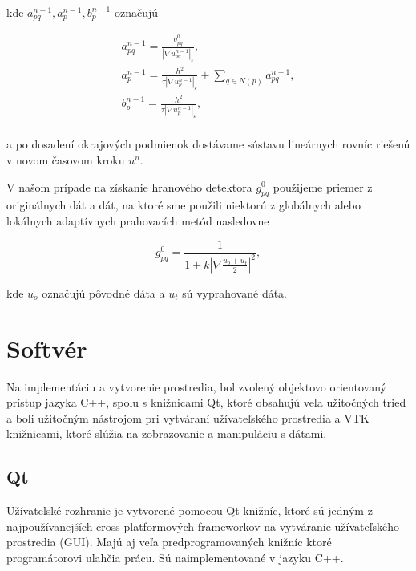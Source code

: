 \documentclass[a4paper,12pt,twoside]{article}%
\def\epsilon{\varepsilon}
\begin{document}
kde $a_{pq}^{n - 1}, a_p^{n - 1}, b_p^{n - 1}$ označujú

\begin{equation}
\begin{array}{l}
a_{pq}^{n - 1}  = \frac{g_{pq}^{0}}{|\nabla u_{pq}^{n-1}|_{\epsilon}}, \\
a_p^{n - 1} = \frac{h^2}{\tau|\nabla u_p^{n-1}|_{\epsilon}} + \sum_{q \in N(p)} a_{pq}^{n - 1}, \\
b_p^{n - 1} = \frac{h^2}{\tau|\nabla u_p^{n-1}|_{\epsilon}}, \\
\end{array}
\end{equation}

a po dosadení okrajových podmienok dostávame sústavu lineárnych rovníc riešenú v novom časovom kroku $u^n$.

V našom prípade na získanie hranového detektora $g_{pq}^{0}$ použijeme priemer z originálnych dát a dát, na ktoré sme použili niektorú z globálnych alebo lokálnych adaptívnych prahovacích metód nasledovne

\begin{equation}
g_{pq}^{0} = \frac{1}{1 + k|\nabla \frac{u_o + u_t}{2}|^2},
\end{equation}

kde $u_o$ označujú pôvodné dáta a $u_t$ sú vyprahované dáta. 

\newpage
\section{Softvér}

Na implementáciu a vytvorenie prostredia, bol zvolený objektovo orientovaný prístup jazyka C++, spolu s knižnicami Qt, ktoré obsahujú veľa užitočných tried a boli užitočným nástrojom pri vytváraní užívateľského prostredia a VTK knižnicami, ktoré slúžia na zobrazovanie a manipuláciu s dátami.

\subsection{Qt}
Užívateľské rozhranie je vytvorené pomocou Qt knižníc, ktoré sú jedným z najpoužívanejších cross-platformových frameworkov na vytváranie užívateľského prostredia (GUI). Majú aj veľa predprogramovaných knižníc ktoré programátorovi uľahčia prácu. Sú naimplementované v jazyku C++. 
\end{document}
